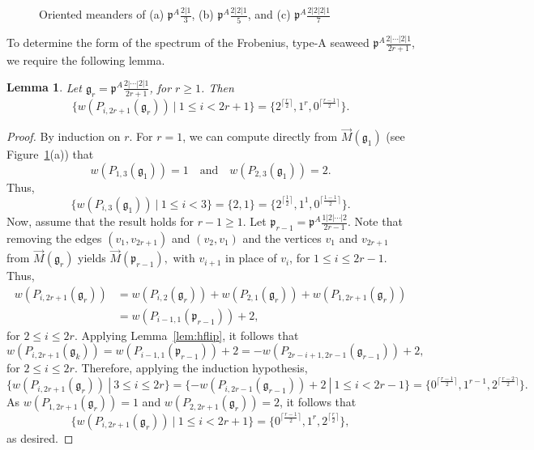 \documentclass[letterpaper,10pt]{article}
\newtheorem{lemma}[theorem]{Lemma}
\begin{document}
\begin{figure}[H]
    \caption{Oriented meanders of (a) $\mathfrak{p}^A\frac{2|1}{3}$, (b) $\mathfrak{p}^A\frac{2|2|1}{5}$, and (c) $\mathfrak{p}^A\frac{2|2|2|1}{7}$}
    \label{fig:2...21}
\end{figure}

To determine the form of the spectrum of the Frobenius, type-A seaweed $\mathfrak{p}^A\frac{2|\cdots|2|1}{2r+1}$, we require the following lemma.

\begin{lemma}\label{lem:2...21}
Let $\mathfrak{g}_r=\mathfrak{p}^A\frac{2|\cdots|2|1}{2r+1}$, for $r\ge 1$. Then $$\{w(P_{i,2r+1}(\mathfrak{g}_r))~|~1\le i< 2r+1\}=\{2^{\lceil\frac{r}{2}\rceil},1^r,0^{\lceil\frac{r-1}{2}\rceil}\}.$$
\end{lemma}
\begin{proof}
By induction on $r$. For $r=1$, we can compute directly from $\overrightarrow{M}(\mathfrak{g}_1)$ (see Figure~\ref{fig:2...21}(a)) that $$w(P_{1,3}(\mathfrak{g}_1))=1\quad\text{and}\quad w(P_{2,3}(\mathfrak{g}_1))=2.$$ Thus, $$\{w(P_{i,3}(\mathfrak{g}_1))~|~1\le i< 3\}=\{2,1\}=\{2^{\lceil\frac{1}{2}\rceil},1^1,0^{\lceil\frac{1-1}{2}\rceil}\}.$$ Now, assume that the result holds for $r-1\ge 1$. Let $\mathfrak{p}_{r-1}=\mathfrak{p}^A\frac{1|2|\cdots|2}{2r-1}$. Note that removing the edges $(v_1,v_{2r+1})$ and $(v_2,v_1)$ and the vertices $v_1$ and $v_{2r+1}$ from $\overrightarrow{M}(\mathfrak{g}_r)$ yields $\overrightarrow{M}(\mathfrak{p}_{r-1}),$ with $v_{i+1}$ in place of $v_i$, for $1\le i\le 2r-1$. Thus,
\begin{align*}
    w(P_{i,2r+1}(\mathfrak{g}_r))&=w(P_{i,2}(\mathfrak{g}_r))+w(P_{2,1}(\mathfrak{g}_r))+w(P_{1,2r+1}(\mathfrak{g}_r)) \\
    &=w(P_{i-1,1}(\mathfrak{p}_{r-1}))+2,
\end{align*}
for $2\le i\le 2r$. Applying Lemma~\ref{lem:hflip}, it follows that $$w(P_{i,2r+1}(\mathfrak{g}_k))=w(P_{i-1,1}(\mathfrak{p}_{r-1}))+2=-w(P_{2r-i+1,2r-1}(\mathfrak{g}_{r-1}))+2,$$ for $2\le i\le 2r$. Therefore, applying the induction hypothesis, $$\{w(P_{i,2r+1}(\mathfrak{g}_r))~|~3\le i\le 2r\}=\{-w(P_{i,2r-1}(\mathfrak{g}_{r-1}))+2~|~1\le i< 2r-1\}=\{0^{\lceil\frac{r-1}{2}\rceil},1^{r-1},2^{\lceil\frac{r-2}{2}\rceil}\}.$$ As $w(P_{1,2r+1}(\mathfrak{g}_r))=1$ and $w(P_{2,2r+1}(\mathfrak{g}_r))=2$, it follows that $$\{w(P_{i,2r+1}(\mathfrak{g}_r))~|~1\le i< 2r+1\}=\{0^{\lceil\frac{r-1}{2}\rceil},1^{r},2^{\lceil\frac{r}{2}\rceil}\},$$ as desired.
\end{proof}
\end{document}
